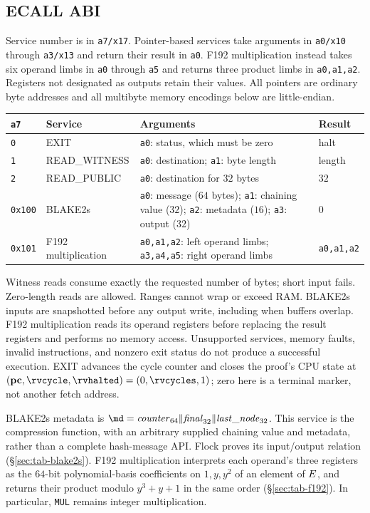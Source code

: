 \subsection{ECALL ABI}\label{sec:rv-ecall}

Service number is in \texttt{a7/x17}. Pointer-based services take arguments in \texttt{a0/x10} through \texttt{a3/x13} and return their result in \texttt{a0}. F192 multiplication instead takes six operand limbs in \texttt{a0} through \texttt{a5} and returns three product limbs in \texttt{a0,a1,a2}. Registers not designated as outputs retain their values. All pointers are ordinary byte addresses and all multibyte memory encodings below are little-endian.
\begin{center}
\begin{tabularx}{\textwidth}{@{}llXl@{}}
\hline
\texttt{a7} & Service & Arguments & Result\\
\hline
\texttt{0} & EXIT & \texttt{a0}: status, which must be zero & halt\\
\texttt{1} & READ\_WITNESS & \texttt{a0}: destination; \texttt{a1}: byte length & length\\
\texttt{2} & READ\_PUBLIC & \texttt{a0}: destination for $32$ bytes & $32$\\
\texttt{0x100} & BLAKE2s & \texttt{a0}: message ($64$ bytes); \texttt{a1}: chaining value ($32$); \texttt{a2}: metadata ($16$); \texttt{a3}: output ($32$) & $0$\\
\texttt{0x101} & F192 multiplication & \texttt{a0,a1,a2}: left operand limbs; \texttt{a3,a4,a5}: right operand limbs & \texttt{a0,a1,a2}\\
\hline
\end{tabularx}
\end{center}
Witness reads consume exactly the requested number of bytes; short input fails. Zero-length reads are allowed. Ranges cannot wrap or exceed RAM. BLAKE2s inputs are snapshotted before any output write, including when buffers overlap. F192 multiplication reads its operand registers before replacing the result registers and performs no memory access. Unsupported services, memory faults, invalid instructions, and nonzero exit status do not produce a successful execution. EXIT advances the cycle counter and closes the proof's CPU state at $(\pc,\rvcycle,\rvhalted)=(0,\rvcycles,1)$; zero here is a terminal marker, not another fetch address.

BLAKE2s metadata is $\md=\mathit{counter}_{64}\Vert\mathit{final}_{32}\Vert\mathit{last\_node}_{32}$. This service is the compression function, with an arbitrary supplied chaining value and metadata, rather than a complete hash-message API. Flock proves its input/output relation (\S\ref{sec:tab-blake2s}). F192 multiplication interprets each operand's three registers as the $64$-bit polynomial-basis coefficients on $1,y,y^2$ of an element of $E$, and returns their product modulo $y^3+y+1$ in the same order (\S\ref{sec:tab-f192}). In particular, \texttt{MUL} remains integer multiplication.
